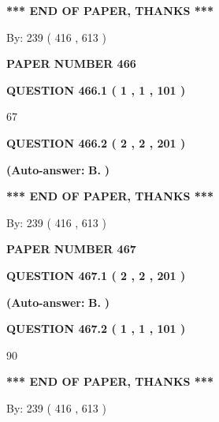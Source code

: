 \documentclass{ctexart}
\begin{document}
 
   
   
   
   
\vspace{1.0in} 
{\textbf{\large{ *** END OF PAPER, THANKS *** }}} 
   
   
\hspace{1.0in} By: 
 239 ( 416 ,  613 )
   
   
   
   
\newpage 
\setcounter{page}{ 
   466001 } 
   
   
 {\textbf{ \Large{ PAPER NUMBER  466  }}}
   
   
   
   
  
  
{\textbf{\large{QUESTION
466.1 
 ( 1 , 1 , 101 )
}}}

67
  
  
{\textbf{\large{QUESTION
466.2 
 ( 2 , 2 , 201 )
}}}
 
 
{\textbf{(Auto-answer:}}
{\textbf{\large{
B.}}}
{\textbf{)}}
 
 
   
   
   
   
\vspace{1.0in} 
{\textbf{\large{ *** END OF PAPER, THANKS *** }}} 
   
   
\hspace{1.0in} By: 
 239 ( 416 ,  613 )
   
   
   
   
\newpage 
\setcounter{page}{ 
   467001 } 
   
   
 {\textbf{ \Large{ PAPER NUMBER  467  }}}
   
   
   
   
  
  
{\textbf{\large{QUESTION
467.1 
 ( 2 , 2 , 201 )
}}}
 
 
{\textbf{(Auto-answer:}}
{\textbf{\large{
B.}}}
{\textbf{)}}
 
 
  
  
{\textbf{\large{QUESTION
467.2 
 ( 1 , 1 , 101 )
}}}

90
   
   
   
   
\vspace{1.0in} 
{\textbf{\large{ *** END OF PAPER, THANKS *** }}} 
   
   
\hspace{1.0in} By: 
 239 ( 416 ,  613 )
   
   
   
   
\newpage 
\setcounter{page}{ 
   468001 } 
   
\end{document}
